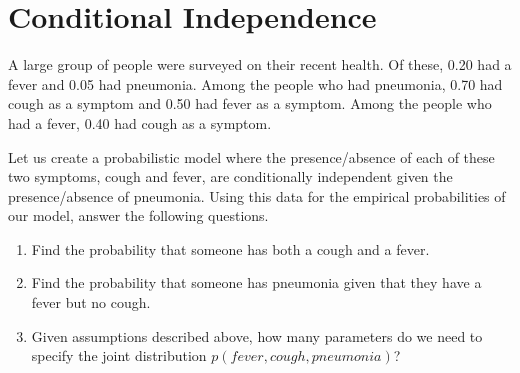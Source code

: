 \documentclass[11pt]{article}
\begin{document}
\pagebreak
\section{Conditional Independence}
A large group of people were surveyed on their recent health. Of these, 0.20 had a fever and 0.05 had pneumonia. Among the people who had pneumonia, 0.70 had cough as a symptom and 0.50 had fever as a symptom. Among the people who had a fever, 0.40 had cough as a symptom.

Let us create a probabilistic model where the presence/absence of each of these two symptoms, cough and fever, are conditionally independent given the presence/absence of pneumonia. Using this data for the empirical probabilities of our model, answer the following questions.
\begin{enumerate}
\item Find the probability that someone has both a cough and a fever. \\
\begin{answertext}{6cm}{}


  
\end{answertext} 
\item Find the probability that someone has pneumonia given that they have a fever but no cough. \\
\begin{answertext}{6cm}{}
\end{answertext} 

\newpage

\item Given assumptions described above, how many parameters do we need to specify the joint distribution $p(fever, cough, pneumonia)$?  \\
\begin{answertext}{6cm}{}
\end{answertext} 
\end{enumerate}


\pagebreak
\end{document}
